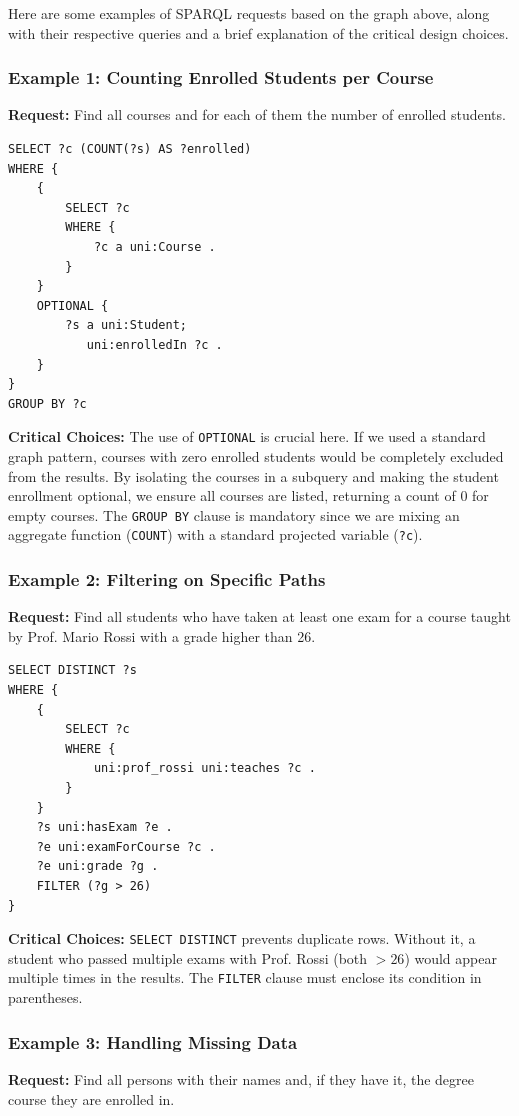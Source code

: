 Here are some examples of SPARQL requests based on the graph above, along with their respective queries and a brief explanation of the critical design choices.

\subsubsection*{Example 1: Counting Enrolled Students per Course}
\textbf{Request:} Find all courses and for each of them the number of enrolled students.

\begin{lstlisting}
SELECT ?c (COUNT(?s) AS ?enrolled)
WHERE {
    {
        SELECT ?c
        WHERE {
            ?c a uni:Course .
        }
    }
    OPTIONAL {  
        ?s a uni:Student;
           uni:enrolledIn ?c .
    }
}
GROUP BY ?c
\end{lstlisting}
\textbf{Critical Choices:} 
The use of \texttt{OPTIONAL} is crucial here. If we used a standard graph pattern, courses with zero enrolled students would be completely excluded from the results. By isolating the courses in a subquery and making the student enrollment optional, we ensure all courses are listed, returning a count of 0 for empty courses. The \texttt{GROUP BY} clause is mandatory since we are mixing an aggregate function (\texttt{COUNT}) with a standard projected variable (\texttt{?c}).

\subsubsection*{Example 2: Filtering on Specific Paths}
\textbf{Request:} Find all students who have taken at least one exam for a course taught by Prof. Mario Rossi with a grade higher than 26.

\begin{lstlisting}
SELECT DISTINCT ?s
WHERE {
    {
        SELECT ?c
        WHERE {
            uni:prof_rossi uni:teaches ?c .
        }
    }
    ?s uni:hasExam ?e .
    ?e uni:examForCourse ?c .
    ?e uni:grade ?g .
    FILTER (?g > 26)
}
\end{lstlisting}
\textbf{Critical Choices:} 
\texttt{SELECT DISTINCT} prevents duplicate rows. Without it, a student who passed multiple exams with Prof. Rossi (both $> 26$) would appear multiple times in the results. The \texttt{FILTER} clause must enclose its condition in parentheses.

\subsubsection*{Example 3: Handling Missing Data}
\textbf{Request:} Find all persons with their names and, if they have it, the degree course they are enrolled in.

